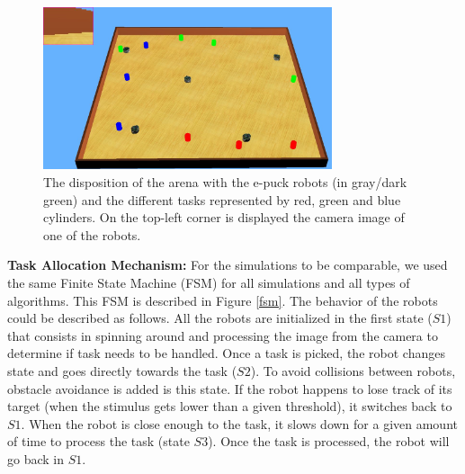\begin{figure}[thpb]
	\begin{center}
		\includegraphics[width=8.5cm]{Pictures/Capture.png}
		\caption{The disposition of the arena with the e-puck robots (in gray/dark green) and the different tasks represented by red, green and blue cylinders. On the top-left corner is displayed the camera image of one of the robots.}
    \label{screenshot}
	\end{center}
	
\end{figure}

\textbf{Task Allocation Mechanism:}
For the simulations to be comparable, we used the same Finite State Machine (FSM) for all simulations and all types of algorithms. This FSM is described in Figure \ref{fsm}. The behavior of the robots could be described as follows. All the robots are initialized in the first state ($S1$) that consists in spinning around and processing the image from the camera to determine if task needs to be handled. Once a task is picked, the robot changes state and goes directly towards the task ($S2$). To avoid collisions between robots, obstacle avoidance is added is this state. If the robot happens to lose track of its target (when the stimulus gets lower than a given threshold), it switches back to $S1$. When the robot is close enough to the task, it slows down for a given amount of time to process the task (state $S3$). Once the task is processed, the robot will go back in $S1$.

